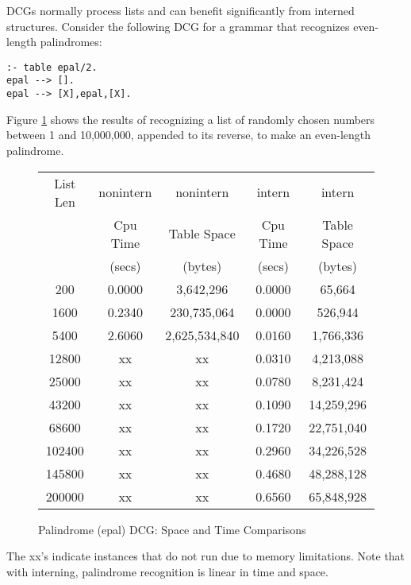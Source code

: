 \documentclass{llncs}
\begin{document}
DCGs normally process lists and can benefit significantly from
interned structures.  Consider the following DCG for a grammar that
recognizes even-length palindromes:
\begin{verbatim}
:- table epal/2.
epal --> [].
epal --> [X],epal,[X].
\end{verbatim}
Figure \ref{palindrome-table} shows the results of recognizing a list
of randomly chosen numbers between 1 and 10,000,000, appended to its
reverse, to make an even-length palindrome.
\begin{figure}
\begin{center}
\begin{tabular}{|c|c|c|c|c|} \hline
List Len &  nonintern &      nonintern  &     intern &      intern \\
         &   Cpu Time &     Table Space &    Cpu Time &    Table Space \\
	 &    (secs)  &        (bytes)  &      (secs) &      (bytes)\\ \hline
200      &  0.0000    &     3,642,296   &     0.0000  &      65,664 \\
1600      &   0.2340   &     230,735,064   &     0.0000  &      526,944 \\
5400     &   2.6060   &   2,625,534,840   &    0.0160   &     1,766,336  \\
12800     &   xx   &   xx   &  0.0310     &    4,213,088   \\
25000     &   xx   &   xx   &   0.0780     &  8,231,424   \\
43200    &   xx   &   xx   &  0.1090     &   14,259,296   \\
68600    &   xx   &   xx   &  0.1720     &   22,751,040    \\
102400    &   xx   &   xx   &  0.2960     &   34,226,528    \\
145800    &   xx   &   xx   &  0.4680     &   48,288,128    \\
200000    &   xx   &   xx   &  0.6560     &  65,848,928    \\ \hline
\end{tabular}
\caption{Palindrome (epal) DCG: Space and Time Comparisons}\label{palindrome-table}
\end{center}
\end{figure}
The xx's indicate instances that do not run due to memory limitations.
Note that with interning, palindrome recognition is linear in
time and space.
\end{document}
